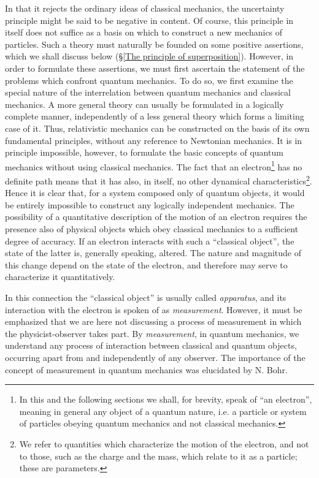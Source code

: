 In that it rejects the ordinary ideas of classical mechanics, the uncertainty principle might be said to be negative in content. Of course, this principle in itself does not suffice as a basis on which to construct a new mechanics of particles. Such a theory must naturally be founded on some positive assertions, which we shall discuss below (§\ref{The principle of superposition}). However, in order to formulate these assertions, we must first ascertain the statement of the problems which confront quantum mechanics. To do so, we first examine the special nature of the interrelation between quantum mechanics and classical mechanics. A more general theory can usually be formulated in a logically complete manner, independently of a less general theory which forms a limiting case of it. Thus, relativistic mechanics can be constructed on the basis of its own fundamental principles, without any reference to Newtonian mechanics. It is in principle impossible, however, to formulate the basic concepts of quantum mechanics without using classical mechanics. The fact that an electron\footnote{In this and the following sections we shall, for brevity, speak of “an electron”, meaning in general any object of a quantum nature, i.e. a particle or system of particles obeying quantum mechanics and not classical mechanics.
} has no definite path means that it has also, in itself, no other dynamical characteristics\footnote{We refer to quantities which characterize the motion of the electron, and not to those, such as the charge and the mass, which relate to it as a particle; these are parameters.
}. Hence it is clear that, for a system composed only of quantum objects, it would be entirely impossible to construct any logically independent mechanics. The possibility of a quantitative description of the motion of an electron requires the presence also of physical objects which obey classical mechanics to a sufficient degree of accuracy. If an electron interacts with such a “classical object”, the state of the latter is, generally speaking, altered. The nature and magnitude of this change depend on the state of the electron, and therefore may serve to characterize it quantitatively.


In this connection the “classical object” is usually called \textit{apparatus}, and its interaction with the electron is spoken of as \textit{measurement}. However, it must be emphasized that we are here not discussing a process of measurement in which the physicist-observer takes part. By \textit{measurement}, in quantum mechanics, we understand any process of interaction between classical and quantum objects, occurring apart from and independently of any observer. The importance of the concept of measurement in quantum mechanics was elucidated by N. Bohr.


